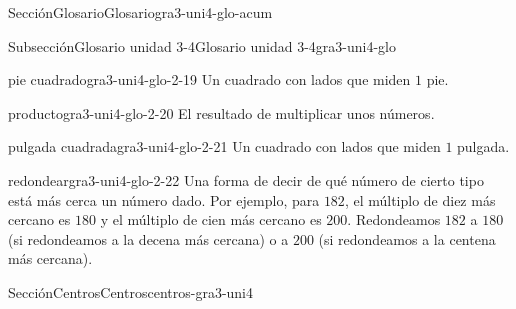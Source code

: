 \documentclass[oneside,10pt,]{article}
\begin{document}
\begin{sectionptx}{Sección}{Glosario}{}{Glosario}{}{}{gra3-uni4-glo-acum}
\begin{subsectionptx}{Subsección}{Glosario unidad 3-4}{}{Glosario unidad 3-4}{}{}{gra3-uni4-glo}
\begin{descriptionlist}
\begin{dlimedium}{pie cuadrado}{gra3-uni4-glo-2-19}
Un cuadrado con lados que miden \(1\) pie.%
\end{dlimedium}%
\begin{dlimedium}{producto}{gra3-uni4-glo-2-20}%
El resultado de multiplicar unos números.%
\end{dlimedium}%
\begin{dlimedium}{pulgada cuadrada}{gra3-uni4-glo-2-21}%
Un cuadrado con lados que miden \(1\) pulgada.%
\end{dlimedium}%
\begin{dlimedium}{redondear}{gra3-uni4-glo-2-22}%
Una forma de decir de qué número de cierto tipo está más cerca un número dado. Por ejemplo, para \(182\), el múltiplo de diez más cercano es \(180\) y el múltiplo de cien más cercano es \(200\). Redondeamos \(182\) a \(180\) (si redondeamos a la decena más cercana) o a \(200\) (si redondeamos a la centena más cercana).%
\end{dlimedium}%
\end{descriptionlist}
\end{subsectionptx}
\end{sectionptx}
%
%
\typeout{************************************************}
\typeout{************************************************}
%
\begin{sectionptx}{Sección}{Centros}{}{Centros}{}{}{centros-gra3-uni4}
\end{sectionptx}
%
%
\typeout{************************************************}
\typeout{************************************************}
%
\end{document}
